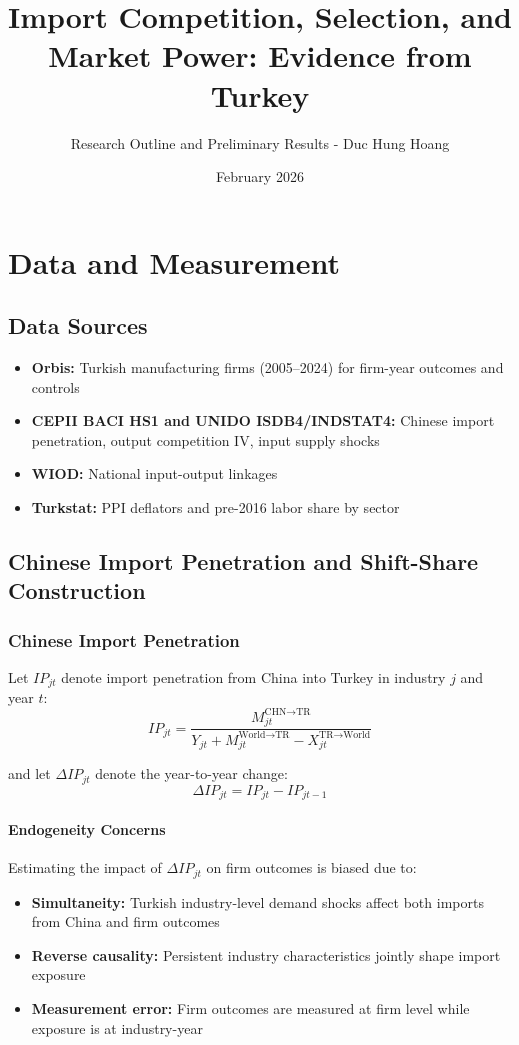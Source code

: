 \documentclass[12pt]{article}
\title{Import Competition, Selection, and Market Power: Evidence from Turkey}
\author{Research Outline and Preliminary Results - Duc Hung Hoang}
\date{February 2026}
\begin{document}
\maketitle

\section{Data and Measurement}

\subsection{Data Sources}

\begin{itemize}
    \item \textbf{Orbis:} Turkish manufacturing firms (2005--2024) for firm-year outcomes and controls
    \item \textbf{CEPII BACI HS1 and UNIDO ISDB4/INDSTAT4:} Chinese import penetration, output competition IV, input supply shocks
    \item \textbf{WIOD:} National input-output linkages
    \item \textbf{Turkstat:} PPI deflators and pre-2016 labor share by sector
\end{itemize}

\subsection{Chinese Import Penetration and Shift-Share Construction}

\subsubsection{Chinese Import Penetration}

Let $IP_{jt}$ denote import penetration from China into Turkey in industry $j$ and year $t$:
\[
IP_{jt} = \frac{M_{jt}^{\text{CHN} \to \text{TR}}}{Y_{jt} + M_{jt}^{\text{World} \to \text{TR}} - X_{jt}^{\text{TR} \to \text{World}}}
\]

and let $\Delta IP_{jt}$ denote the year-to-year change:
\[
\Delta IP_{jt} = IP_{jt} - IP_{jt-1}
\]

\paragraph{Endogeneity Concerns}

Estimating the impact of $\Delta IP_{jt}$ on firm outcomes is biased due to:
\begin{itemize}
    \item \textbf{Simultaneity:} Turkish industry-level demand shocks affect both imports from China and firm outcomes
    \item \textbf{Reverse causality:} Persistent industry characteristics jointly shape import exposure
    \item \textbf{Measurement error:} Firm outcomes are measured at firm level while exposure is at industry-year
\end{itemize}
\end{document}
